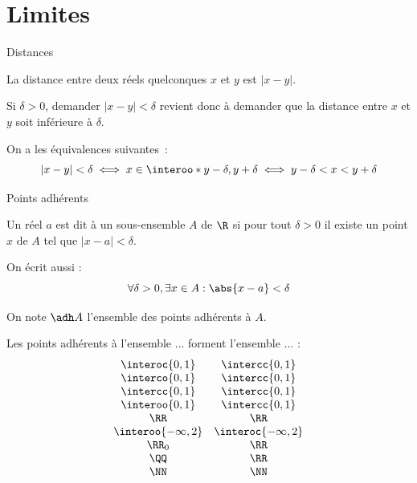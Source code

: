 \section{Limites}

\begin{frame}{Distances}
  \begin{rappel}
    La distance entre deux réels quelconques $x$ et $y$ est $|x - y|$.
  \end{rappel}

  \begin{block}{}
  Si $\delta > 0$, demander $|x - y| < \delta$ revient donc à demander que la distance entre $x$ et $y$ soit inférieure à $\delta$.
\end{block}

\begin{block}{}
On a les équivalences suivantes~:
  \begin{equation*}
    |x - y| < \delta \iff x \in \interoo*{y-\delta,y+\delta} \iff y - \delta < x < y+\delta
  \end{equation*}
\end{block}

\end{frame}

\begin{frame}{Points adhérents}
  \begin{definition}
    Un réel $a$ est dit  à un sous-ensemble $A$ de $\R$ si pour tout $\delta > 0$ il existe un point $x$ de $A$ tel que $|x - a| < \delta$.

    \pause On écrit aussi :
    \begin{equation}
      \forall \delta > 0, \exists x \in A : \abs{x-a} < \delta
    \end{equation}
  \end{definition}\pause

On note \(\adh A\) l'ensemble des points adhérents à \(A\).
\end{frame}

\begin{frame}%
  \begin{example}
    Les points adhérents à l'ensemble ... forment l'ensemble ... :
    \begin{equation*}
      \begin{array}{cc}
        \interoc{0,1} &\intercc{0,1}\\
        \interco{0,1} &\intercc{0,1}\\
        \intercc{0,1} &\intercc{0,1}\\
        \interoo{0,1} &\intercc{0,1}\\
        \RR & \RR\\
        \interoo{-\infty, 2} &       \interoc{-\infty, 2}\\
        \RR_0 & \RR\\
        \QQ & \RR\\
        \NN &\NN
      \end{array}
  \end{equation*}
  \end{example}
\end{frame}

